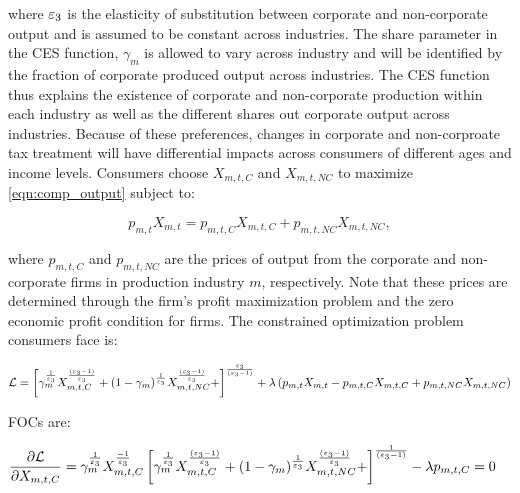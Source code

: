 	\noindent where $\varepsilon_{3}$ is the elasticity of substitution between corporate and non-corporate output and is assumed to be constant across industries.  The share parameter in the CES function, $\gamma_{m}$ is allowed to vary across industry and will be identified by the fraction of corporate produced output across industries.  The CES function thus explains the existence of corporate and non-corporate production within each industry as well as the different shares out corporate output across industries.  Because of these preferences, changes in corporate and non-corproate tax treatment will have differential impacts across consumers of different ages and income levels.  
	Consumers choose $X_{m,t,C}$ and $X_{m,t,NC}$ to maximize \ref{eqn:comp_output} subject to:
	
	 \begin{equation} \label{eqn:comp_output_cons}
             p_{m,t}X_{m,t} = p_{m,t,C}X_{m,t,C}+p_{m,t,NC}X_{m,t,NC}, 
    	\end{equation}
	
	
\noindent where $p_{m,t,C}$ and $p_{m,t,NC}$ are the prices of output from the corporate and non-corporate firms in production industry $m$, respectively.  Note that these prices are determined through the firm's profit maximization problem and the zero economic profit condition for firms. The constrained optimization problem consumers face is: 
    
 \begin{equation} \label{eqn:comp_output_lagrangian}
	\begin{split}
	 \mathcal{L} = \left[\gamma_{m}^{\frac{1}{\varepsilon_{3}}}X_{m,t,C}^{\frac{(\varepsilon_{3}-1)}{\varepsilon_{3}}}+(1-\gamma_{m})^{\frac{1}{\varepsilon_{3}}}X_{m,t,NC}^{\frac{(\varepsilon_{3}-1)}{\varepsilon_{3}}}+\right]^{\frac{\varepsilon_{3}}{(\varepsilon_{3}-1)}} + \lambda\left(p_{m,t}X_{m,t} - p_{m,t,C}X_{m,t,C}+p_{m,t,NC}X_{m,t,NC}\right)
  	\end{split}
\end{equation}
    
    FOCs are:
    
\begin{equation} \label{eqn:comp_output_foc_C}
	\begin{split}
       	&  \frac{\partial \mathcal{L}}{\partial X_{m,t,C}} = \gamma_{m}^{\frac{1}{\varepsilon_{3}}} X_{m,t,C}^{\frac{-1}{\varepsilon_{3}}} \left[\gamma_{m}^{\frac{1}{\varepsilon_{3}}}X_{m,t,C}^{\frac{(\varepsilon_{3}-1)}{\varepsilon_{3}}}+(1-\gamma_{m})^{\frac{1}{\varepsilon_{3}}}X_{m,t,NC}^{\frac{(\varepsilon_{3}-1)}{\varepsilon_{3}}}+\right]^{\frac{1}{(\varepsilon_{3}-1)}} - \lambda p_{m,t,C} = 0
      	 \end{split}
\end{equation}
    
